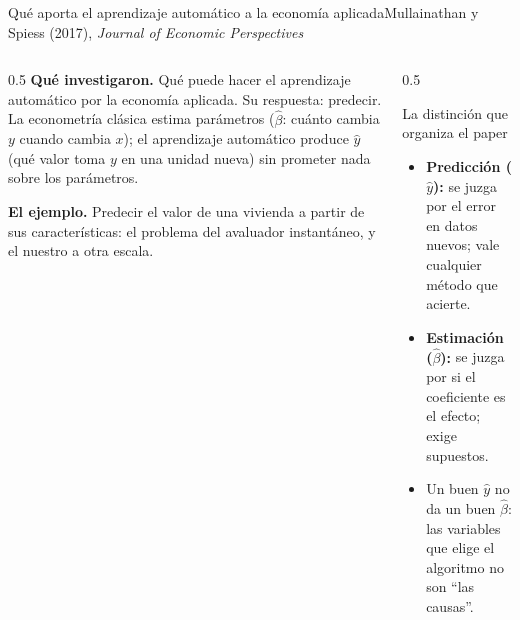 \documentclass{beamer}
\begin{document}
\begin{frame}{Qué aporta el aprendizaje automático a la economía aplicada}{Mullainathan y Spiess (2017), \emph{Journal of Economic Perspectives}}
\small
\begin{columns}[T]
\begin{column}{0.5\textwidth}
\textbf{Qué investigaron.} Qué puede hacer el aprendizaje automático por la economía aplicada. Su respuesta: predecir. La econometría clásica estima parámetros ($\hat\beta$: cuánto cambia $y$ cuando cambia $x$); el aprendizaje automático produce $\hat y$ (qué valor toma $y$ en una unidad nueva) sin prometer nada sobre los parámetros.

\medskip
\textbf{El ejemplo.} Predecir el valor de una vivienda a partir de sus características: el problema del avaluador instantáneo, y el nuestro a otra escala.
\end{column}
\begin{column}{0.5\textwidth}
\begin{block}{La distinción que organiza el paper}
\begin{itemize}\itemsep3pt
  \item \textbf{Predicción ($\hat y$):} se juzga por el error en datos nuevos; vale cualquier método que acierte.
  \item \textbf{Estimación ($\hat\beta$):} se juzga por si el coeficiente es el efecto; exige supuestos.
  \item Un buen $\hat y$ no da un buen $\hat\beta$: las variables que elige el algoritmo no son ``las causas''.
\end{itemize}
\end{block}
\end{column}
\end{columns}
\end{frame}
\end{document}
